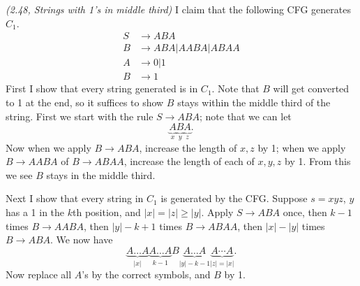 \pagebreak


\begin{problem}{\it (2.48, Strings with 1's in middle third)}
I claim that the following CFG generates $C_1$.
\begin{align*}
S&\to ABA\\
B&\to ABA|AABA|ABAA\\
A&\to 0|1\\
B&\to 1
\end{align*}
First I show that every string generated is in $C_1$. Note that $B$ will get converted to 1 at the end, so it suffices to show $B$ stays within the middle third of the string. First we start with the rule $S\to ABA$; note that we can let
\[
\underbrace{A}_x\underbrace{B}_y\underbrace{A}_z.
\]
Now when we apply $B\to ABA$, increase the length of $x,z$ by 1; when we apply $B\to AABA$ of $B\to ABAA$, increase the length of each of $x,y,z$ by 1. From this we see $B$ stays in the middle third.

Next I show that every string in $C_1$ is generated by the CFG. Suppose $s=xyz$, $y$ has a 1 in the $k$th position, and $|x|=|z|\ge |y|$. Apply $S\to ABA$ once, then $k-1$ times $B\to AABA$, then $|y|-k+1$ times $B\to ABAA$, then $|x|-|y|$ times $B\to ABA$. We now have
\[
\underbrace{A\ldots A}_{|x|}\underbrace{A\ldots A}_{k-1} B \underbrace{A\ldots A}_{|y|-k-1}\underbrace{A\cdots A}_{|z|=|x|}.
\]
Now replace all $A$'s by the correct symbols, and $B$ by 1.\\


\end{problem}
